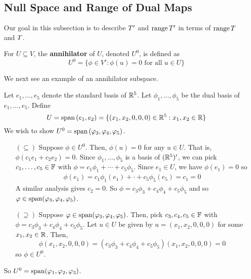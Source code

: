 \subsection*{Null Space and Range of Dual Maps}
Our goal in this subsection is to describe $\null T'$ and $\operatorname{range} T'$ in terms of $\operatorname{range} T$ and $\null T$. 
\begin{definition}[Annihilator]
    For $U\subseteq V$, the \textbf{annihilator} of $U$, denoted $U^0$, is defined as
    \[ U^0 = \{  \phi \in V' : \phi(u) = 0 \text{ for all }u\in U\} \]
\end{definition}
We next see an example of an annihilator subspace.
\begin{example}
    Let $e_1, \dots, e_5$ denote the standard basis of $\mathbb{R}^5$. Let $\phi_1, \dots, \phi_5$ be the dual basis of $e_1, \dots, e_5$. Define
    \[ U = \operatorname{span}{(e_1, e_2)} = \{ (x_1, x_2, 0, 0, 0) \in \mathbb{R}^5: x_1,x_2\in \mathbb{R} \} \]
    We wish to show $U^0 = \operatorname{span}{(\varphi_3, \varphi_4, \varphi_5)}$.
    \begin{enumerate}
        \item[$(\subseteq)$] Suppose $\phi \in U^0$. Then, $\phi(u) = 0$ for any $u\in U$. That is, $\phi(c_1e_1 + c_2e_2) = 0$. Since $\phi_1, \dots, \phi_5$ is a basis of $(\mathbb{R}^5)'$, we can pick $c_1, \dots, c_5 \in \mathbb F$ with $\phi = c_1\phi_1 + \cdots + c_5\phi_5$. Since $e_1\in U$, we have $\phi(e_1) = 0$ so
        \begin{align*}
            \phi(e_1) = c_1\phi_1(e_1) + \cdot + c_5\phi_5(e_5) = c_1 =0 
        \end{align*}
        A similar analysis gives $c_2 = 0$. So $\phi = c_3\phi_3 + c_4\phi_4 + c_5\phi_5$ and so $\varphi \in \operatorname{span}(\varphi_3, \varphi_4, \varphi_5)$.
        \item[$(\supseteq)$] Suppose $\varphi\in \operatorname{span}(\varphi_3, \varphi_4, \varphi_5)$. Then, pick $c_3, c_4, c_5\in \mathbb F$ with $\phi = c_3\phi_3 + c_4\phi_4 + c_5\phi_5$. Let $u\in U$ be given by $u = (x_1, x_2, 0, 0, 0)$ for some $x_1,x_2\in \mathbb{R}$. Then, 
        \[ \phi(x_1, x_2, 0, 0, 0) = (c_3\phi_3 + c_4\phi_4 + c_5\phi_5)(x_1, x_2, 0, 0, 0) = 0\]
        so $\phi \in U^0$.
    \end{enumerate}
    So $U^0 = \operatorname{span}(\varphi_1, \varphi_2, \varphi_3)$.
\end{example}
